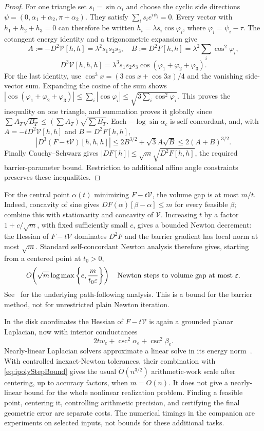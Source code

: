 \begin{proof}
For one triangle set $s_i=\sin\alpha_i$ and choose the cyclic side
directions $\psi=(0,\alpha_1+\alpha_2,\pi+\alpha_2)$.
They satisfy $\sum_i s_i e^{i\psi_i}=0$. Every vector with
$h_1+h_2+h_3=0$ can therefore be written
$h_i=\lambda s_i\cos\varphi_i$, where $\varphi_i=\psi_i-\tau$.
The cotangent energy identity and a trigonometric expansion give
\[
 A:=-D^2\mathcal V[h,h]=\lambda^2s_1s_2s_3,\quad
 B:=D^2F[h,h]=\lambda^2\sum_i\cos^2\varphi_i,
\]
\[
 D^3\mathcal V[h,h,h]
   =\lambda^3s_1s_2s_3\cos(\varphi_1+\varphi_2+\varphi_3).
\]
For the last identity, use $\cos^3 x=(3\cos x+\cos3x)/4$ and the
vanishing side-vector sum. Expanding the cosine of the sum shows
$|\cos(\varphi_1+\varphi_2+\varphi_3)|
\le\sum_i|\cos\varphi_i|\le\sqrt{3\sum_i\cos^2\varphi_i}$.
This proves the inequality on one triangle, and summation proves it
globally since $\sum A_T\sqrt{B_T}\le(\sum A_T)\sqrt{\sum B_T}$.
Each $-\log\sin\alpha_c$ is self-concordant, and, with
$A=-tD^2\mathcal V[h,h]$ and $B=D^2F[h,h]$,
\[
 |D^3(F-t\mathcal V)[h,h,h]|
 \le2B^{3/2}+\sqrt3 A\sqrt B\le2(A+B)^{3/2}.
\]
Finally Cauchy--Schwarz gives $|DF[h]|\le\sqrt m\sqrt{D^2F[h,h]}$,
the required barrier-parameter bound. Restriction to additional affine
angle constraints preserves these inequalities.
\end{proof}

For the central point $\alpha(t)$ minimizing $F-t\mathcal V$, the
volume gap is at most $m/t$. Indeed, concavity of sine gives
$DF(\alpha)[\beta-\alpha]\le m$ for every feasible $\beta$;
combine this with stationarity and concavity of $\mathcal V$.
Increasing $t$ by a factor $1+c/\sqrt m$, with fixed sufficiently
small $c$, gives a bounded Newton decrement: the Hessian of
$F-t\mathcal V$ dominates $D^2F$ and the barrier gradient has local
norm at most $\sqrt m$. Standard self-concordant Newton analysis
therefore gives, starting from a centered point at $t_0>0$,
\begin{equation}
 O\!\left(\sqrt m\log\max\left\{e,\frac{m}{t_0\varepsilon}\right\}\right)
 \quad\hbox{Newton steps to volume gap at most }\varepsilon.
 \label{eq:ipolyStepBound}
\end{equation}
See~\cite[Chapter~11]{BoydVandenberghe} for the underlying path-following
analysis. This is a bound for the barrier method, not for unrestricted
plain Newton iteration.

In the disk coordinates the Hessian of $F-t\mathcal V$ is again a
grounded planar Laplacian, now with interior conductances
\[
 2t w_e+\csc^2\alpha_e+\csc^2\beta_e.
\]
Nearly-linear Laplacian solvers approximate a linear solve in its energy
norm~\cite{SpielmanTengSolvers}. With controlled inexact-Newton
tolerances, their combination with \eqref{eq:ipolyStepBound} gives the
usual $\widetilde O(n^{3/2})$ arithmetic-work scale after centering,
up to accuracy factors, when $m=O(n)$. It does not give a nearly-linear
bound for the whole nonlinear realization problem. Finding a feasible
point, centering it, controlling arithmetic precision, and certifying
the final geometric error are separate costs. The numerical timings in
the companion are experiments on selected inputs, not bounds for these
additional tasks.

